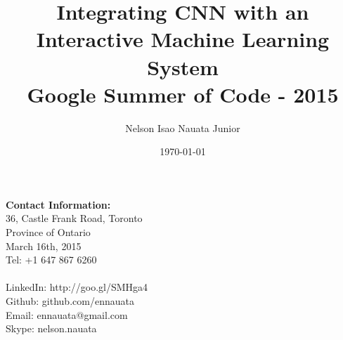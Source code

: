 \documentclass{article}
\title{Integrating CNN with an Interactive Machine Learning System\\Google Summer of Code - 2015} %
\author{Nelson Isao Nauata Junior} %
\date{\today} %
\begin{document}
\maketitle %

\begin{minipage}[ht]{0.48\textwidth}
{\bf Contact Information:}\\

36, Castle Frank Road, Toronto\\
Province of Ontario\\
March 16th, 2015\\
Tel: +1 647 867 6260\\\\
LinkedIn: http://goo.gl/SMHga4\\
Github: github.com/ennauata\\
Email: ennauata@gmail.com\\
Skype: nelson.nauata\\
\end{minipage}



\end{document}
